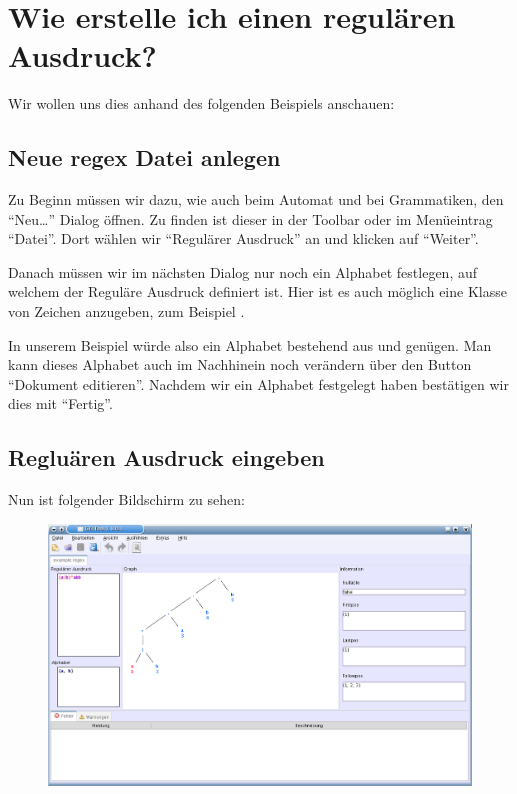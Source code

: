 \chapter{Wie erstelle ich einen regulären Ausdruck?}

Wir wollen uns dies anhand des folgenden Beispiels anschauen: 

\section{Neue regex Datei anlegen}

Zu Beginn müssen wir dazu, wie auch beim Automat und bei Grammatiken, den "`Neu\ldots"' Dialog öffnen. Zu finden ist dieser in der Toolbar oder im Menüeintrag "`Datei"'. Dort wählen wir "`Regulärer Ausdruck"' an und klicken auf "`Weiter"'.\vspace{10pt}

Danach müssen wir im nächsten Dialog nur noch ein Alphabet festlegen, auf welchem der Reguläre Ausdruck definiert ist. Hier ist es auch möglich eine Klasse von Zeichen anzugeben, zum Beispiel \Symbol{[a-z]}.\vspace{10pt}

In unserem Beispiel würde also ein Alphabet bestehend aus  und  genügen. Man kann dieses Alphabet auch im Nachhinein noch verändern über den Button "`Dokument editieren"'. Nachdem wir ein Alphabet festgelegt haben bestätigen wir dies mit "`Fertig"'.\vspace{10pt}

\section{Regluären Ausdruck eingeben}

Nun ist folgender Bildschirm zu sehen:\vspace{10pt}

\begin{figure}[h]
\begin{center}
\includegraphics[width=12cm]{../images/regex_example.png}
\end{center}
\end{figure}

